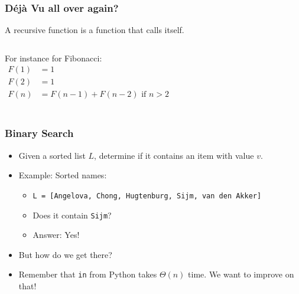 \begin{frame}
	\frametitle{Déjà Vu all over again?}
	
			A recursive function is a function that calls itself.
		
		\begin{columns}
				For instance for Fibonacci:
				\begin{align*}
					F(1) &= 1 \\
					F(2) &= 1 \\
					F(n) &= F(n-1) + F(n-2) \text{ if $n > 2$}\\
				\end{align*}
			
		
				
		\end{columns}
\end{frame}

\begin{frame}
	\frametitle{Binary Search}

			\begin{itemize}
			\item Given a sorted list $L$, determine if it contains an item with value $v$.
			\item Example: Sorted names:
			\begin{itemize}
			\item \texttt{L = [Angelova, Chong, Hugtenburg, Sijm, van den Akker]}
			\item Does it contain \texttt{Sijm}?
			\item Answer: Yes!
			\end{itemize}

			\item \alert{But how do we get there?}
			\item Remember that \texttt{in} from Python takes $\Theta(n)$ time. We want to improve on that!
		\end{itemize}	
\end{frame}

